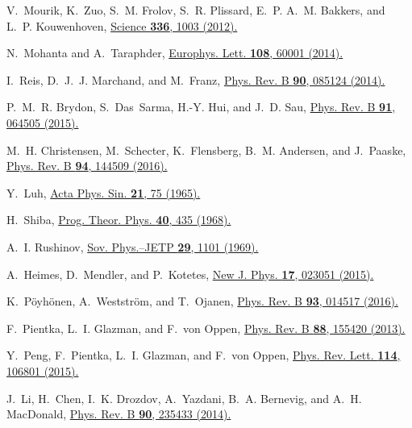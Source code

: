 \documentclass[aps,prl,reprint,nobibnotes]{revtex4-1}
\begin{document}
\begin{thebibliography}{10}
V.~Mourik, K.~Zuo, S.~M. Frolov, S.~R. Plissard, E.~P. A.~M. Bakkers, and L.~P.
  Kouwenhoven,
\newblock \href{https://doi.org/10.1126/science.1222360}{Science {\bf 336}, 1003 (2012).}

N.~Mohanta and A.~Taraphder,
\newblock \href{http://stacks.iop.org/0295-5075/108/i=6/a=60001}{Europhys. Lett. {\bf 108}, 60001 (2014).}

I.~Reis, D.~J.~J. Marchand, and M.~Franz,
\newblock \href{https://doi.org/10.1103/PhysRevB.90.085124}{Phys. Rev. B {\bf 90}, 085124 (2014).}

P.~M.~R. Brydon, S.~Das~Sarma, H.-Y. Hui, and J.~D. Sau,
\newblock \href{https://doi.org/10.1103/PhysRevB.91.064505}{Phys. Rev. B {\bf 91}, 064505 (2015).}

M.~H. Christensen, M.~Schecter, K.~Flensberg, B.~M. Andersen, and J.~Paaske,
\newblock \href{https://doi.org/10.1103/PhysRevB.94.144509}{Phys. Rev. B {\bf 94}, 144509 (2016).}

Y.~Luh,
\newblock \href{https://doi.org/10.7498/aps.21.75}{Acta Phys. Sin. {\bf 21}, 75 (1965).}

H.~Shiba,
\newblock \href{https://doi.org/10.1143/PTP.40.435}{Prog. Theor. Phys. {\bf 40}, 435 (1968).}

A.~I. Rushinov,
\newblock \href{http://www.jetp.ac.ru/cgi-bin/e/index/e/29/6/p1101?a=list}{Sov. Phys.--JETP {\bf 29}, 1101 (1969).}

A.~Heimes, D.~Mendler, and P.~Kotetes,
\newblock \href{http://dx.doi.org/10.1088/1367-2630/17/2/023051}{New J. Phys. {\bf 17}, 023051 (2015).}

K.~P\"oyh\"onen, A.~Weststr\"om, and T.~Ojanen,
\newblock \href{https://doi.org/10.1103/PhysRevB.93.014517}{Phys. Rev. B {\bf 93}, 014517 (2016).}

F.~Pientka, L.~I. Glazman, and F.~von Oppen,
\newblock \href{https://doi.org/10.1103/PhysRevB.88.155420}{Phys. Rev. B {\bf 88}, 155420 (2013).}

Y.~Peng, F.~Pientka, L.~I. Glazman, and F.~von Oppen,
\newblock \href{https://doi.org/10.1103/PhysRevLett.114.106801}{Phys. Rev. Lett. {\bf 114}, 106801 (2015).}

J.~Li, H.~Chen, I.~K. Drozdov, A.~Yazdani, B.~A. Bernevig, and A.~H. MacDonald,
\newblock \href{https://doi.org/10.1103/PhysRevB.90.235433}{Phys. Rev. B {\bf 90}, 235433 (2014).}


\end{thebibliography}
\end{document}
